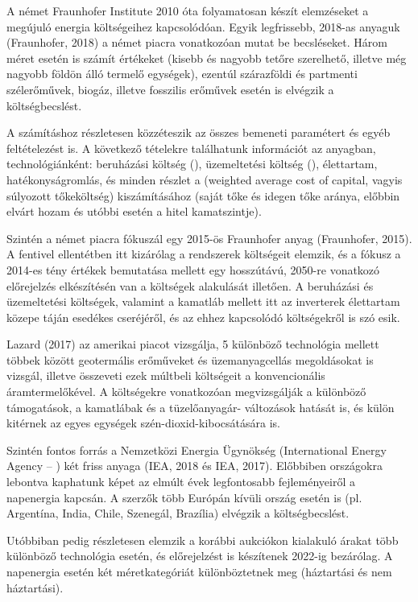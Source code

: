 \documentclass[twoside, magyar, showtrims]{corvinusphd}
\begin{document}
A német Fraunhofer Institute 2010 óta folyamatosan
készít elemzéseket a megújuló energia költségeihez kapcsolódóan.
Egyik legfrissebb, 2018-as anyaguk (Fraunhofer, 2018)
a német piacra vonatkozóan mutat be becsléseket.
Három  méret esetén is számít 
értékeket (kisebb és nagyobb tetőre szerelhető,
illetve még nagyobb földön álló termelő egységek), 
ezentúl szárazföldi és partmenti szélerőművek, biogáz,
illetve fosszilis erőművek esetén is elvégzik a költségbecslést.

A számításhoz részletesen közzéteszik
az összes bemeneti paramétert és egyéb feltételezést is.
A következő tételekre találhatunk információt
az anyagban, technológiánként: beruházási költség
(), üzemeltetési költség (), 
élettartam, hatékonyságromlás, és minden részlet a 
(weighted average cost of capital, vagyis súlyozott tőkeköltség)
kiszámításához (saját tőke és idegen tőke aránya, 
előbbin elvárt hozam és utóbbi esetén a hitel kamatszintje). 

Szintén a német piacra fókuszál egy 2015-ös
Fraunhofer anyag (Fraunhofer, 2015).
A fentivel ellentétben itt kizárólag a  
rendszerek költségeit elemzik, és a fókusz a 2014-es 
tény értékek bemutatása mellett egy hosszútávú,
2050-re vonatkozó előrejelzés elkészítésén 
van a költségek alakulását illetően.
A beruházási és üzemeltetési költségek,
valamint a kamatláb mellett itt az inverterek
élettartam közepe táján esedékes cseréjéről,
és az ehhez kapcsolódó költségekről is szó esik. 

Lazard (2017) az amerikai piacot vizsgálja,
5 különböző  technológia mellett többek
között geotermális erőműveket és üzemanyagcellás megoldásokat is vizsgál,
illetve összeveti ezek múltbeli költségeit a konvencionális áramtermelőkével.
A költségekre vonatkozóan megvizsgálják a különböző támogatások,
a kamatlábak és a tüzelőanyagár-
változások hatását is,
és külön kitérnek az egyes egységek szén-dioxid-kibocsátására is.

Szintén fontos forrás a Nemzetközi Energia
Ügynökség (International Energy Agency -- )
két friss anyaga (IEA, 2018 és IEA, 2017).
Előbbiben országokra lebontva kaphatunk képet
az elmúlt évek legfontosabb fejleményeiről a napenergia kapcsán.
A szerzők több Európán kívüli ország esetén is
(pl. Argentína, India, Chile, Szenegál, Brazília) elvégzik a költségbecslést.

Utóbbiban pedig részletesen elemzik a korábbi
aukciókon kialakuló árakat több különböző technológia esetén,
és előrejelzést is készítenek 2022-ig bezárólag.
A napenergia esetén két méretkategóriát 
különböztetnek meg (háztartási és nem háztartási). 
\end{document}
